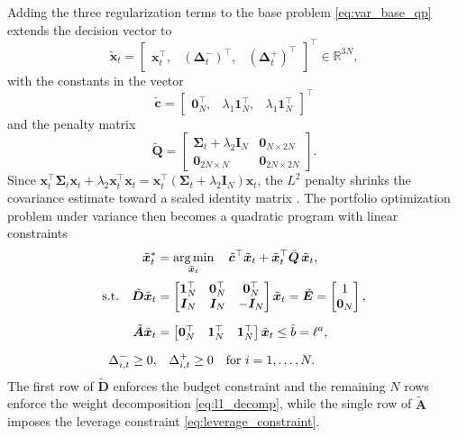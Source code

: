 Adding the three regularization terms to the base problem \eqref{eq:var_base_qp} extends the decision vector to
\begin{equation*}
    \tilde{\bm{x}}_t = \begin{bmatrix} \bm{x}_t^\top,& (\bm{\Delta}_t^-)^\top,& (\bm{\Delta}_t^+)^\top \end{bmatrix}^\top
    \in \mathbb{R}^{3N},
\end{equation*}
with the constants in the vector
\begin{equation*}
    \tilde{\bm{c}} = \begin{bmatrix} \bm{0}_N^\top,& \lambda_1 \bm{1}_N^\top,& \lambda_1 \bm{1}_N^\top \end{bmatrix}^\top
\end{equation*}
and the penalty matrix
\begin{equation*}
    \tilde{\bm{Q}} =
    \begin{bmatrix}
        \bm{\Sigma}_t + \lambda_2 \bm{I}_N & \bm{0}_{N \times 2N} \\
        \bm{0}_{2N \times N} & \bm{0}_{2N \times 2N}
    \end{bmatrix}.
\end{equation*}
Since $\bm{x}_t^\top \bm{\Sigma}_t \bm{x}_t + \lambda_2 \bm{x}_t^\top \bm{x}_t
= \bm{x}_t^\top (\bm{\Sigma}_t + \lambda_2 \bm{I}_N) \bm{x}_t$, the $L^2$ penalty shrinks the covariance estimate toward
a scaled identity matrix \cite{Li2015}. The portfolio optimization problem under variance then becomes a quadratic program
with linear constraints
\begin{equation} \label{eq:var_reg_qp}
\begin{aligned}
    \tilde{\bm{x}}_t^* &= \operatorname*{arg\,min}_{\tilde{\bm{x}}_t} \quad
    \tilde{\bm{c}}^\top \tilde{\bm{x}}_t + \tilde{\bm{x}}_t^\top \tilde{\bm{Q}}\, \tilde{\bm{x}}_t, \\[2pt]
    \text{s.t.} \quad
     \tilde{\bm{D}} \tilde{\bm{x}}_t &=
    \begin{bmatrix} \bm{1}_N^\top & \bm{0}_N^\top & \bm{0}_N^\top \\
    \bm{I}_N & \bm{I}_N & -\bm{I}_N \end{bmatrix} \tilde{\bm{x}}_t
    = \tilde{\bm{E}} = \begin{bmatrix} 1 \\ \bm{0}_N \end{bmatrix}, \\[6pt]
     \tilde{\bm{A}} \tilde{\bm{x}}_t &=
    \begin{bmatrix} \bm{0}_N^\top & \bm{1}_N^\top & \bm{1}_N^\top \end{bmatrix} \tilde{\bm{x}}_t
    \le \tilde{b} = \ell^a, \\[6pt]
     \Delta_{i,t}^- \ge 0, & \quad \Delta_{i,t}^+ \ge 0
    \quad \text{for } i = 1, \dots, N.
\end{aligned}
\end{equation}
The first row of $\tilde{\bm{D}}$ enforces the budget constraint and the remaining $N$ rows enforce the weight
decomposition \eqref{eq:l1_decomp}, while the single row of $\tilde{\bm{A}}$ imposes the leverage constraint
\eqref{eq:leverage_constraint}.

